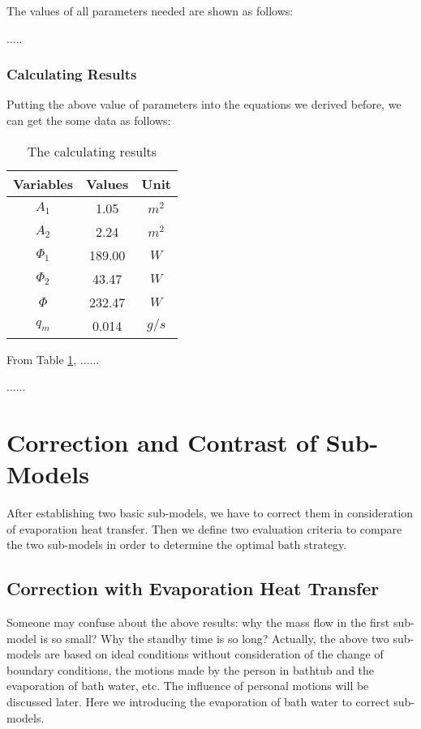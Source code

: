 \documentclass{mcmthesis}
\begin{document}
The values of all parameters needed are shown as follows:

.....

\subsubsection{Calculating Results}

Putting the above value of parameters into the equations we derived before, we can get the some data as follows:

\begin{table}[h]  %
\centering        %
\caption{The calculating results}  %
\vspace{0.15cm}
\label{tab2}                       %
\begin{tabular}{|c|c|c|}  %
\hline                    %
Variables & Values & Unit     \\ \hline  %
$A_1$     & 1.05   &   $m^2$  \\ \hline
$A_2$     & 2.24   &   $m^2$  \\ \hline
$\Phi_1$  & 189.00 &   $W$   \\ \hline
$\Phi_2$  & 43.47  &   $W$   \\ \hline
$\Phi$    & 232.47 &   $W$   \\ \hline
$q_m$     & 0.014  &   $g/s$ \\ \hline
\end{tabular}
\end{table}

From Table \ref{tab2}, ......

......

\section{Correction and Contrast of Sub-Models}

After establishing two basic sub-models, we have to correct them in consideration of evaporation heat transfer. Then we define two evaluation criteria to compare the two sub-models in order to determine the optimal bath strategy.

\subsection{Correction with Evaporation Heat Transfer}

Someone may confuse about the above results: why the mass flow in the first sub-model is so small? Why the standby time is so long? Actually, the above two sub-models are based on ideal conditions without consideration of the change of boundary conditions, the motions made by the person in bathtub and the evaporation of bath water, etc. The influence of personal motions will be discussed later. Here we introducing the evaporation of bath water to correct sub-models.
\end{document}
